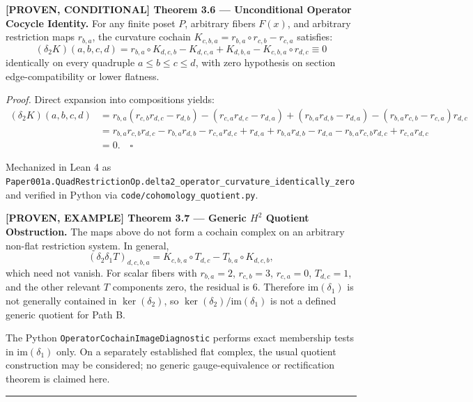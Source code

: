 \documentclass[
  english,
  10pt,
  a4paper,
]{article}
\renewenvironment{quote}
  {\begin{leftbar}\small}
  {\end{leftbar}}
\begin{document}
\begin{quote}
\textbf{{[}PROVEN, CONDITIONAL{]} Theorem 3.6 --- Unconditional Operator
Cocycle Identity.} For any finite poset \(P\), arbitrary fibers
\(F(x)\), and arbitrary restriction maps \(r_{b,a}\), the curvature
cochain \(K_{c,b,a} = r_{b,a} \circ r_{c,b} - r_{c,a}\) satisfies: \[
(\delta_2 K)(a,b,c,d) = r_{b,a} \circ K_{d,c,b} - K_{d,c,a} + K_{d,b,a} - K_{c,b,a} \circ r_{d,c} \equiv 0
\] identically on every quadruple \(a \le b \le c \le d\), with zero
hypothesis on section edge-compatibility or lower flatness.

\emph{Proof.} Direct expansion into compositions yields: \[
\begin{aligned}
(\delta_2 K)(a,b,c,d)
&= r_{b,a}(r_{c,b}r_{d,c} - r_{d,b}) - (r_{c,a}r_{d,c} - r_{d,a}) + (r_{b,a}r_{d,b} - r_{d,a}) - (r_{b,a}r_{c,b} - r_{c,a})r_{d,c} \\
&= r_{b,a}r_{c,b}r_{d,c} - r_{b,a}r_{d,b} - r_{c,a}r_{d,c} + r_{d,a} + r_{b,a}r_{d,b} - r_{d,a} - r_{b,a}r_{c,b}r_{d,c} + r_{c,a}r_{d,c} \\
&= 0. \quad \square
\end{aligned}
\]
\end{quote}

Mechanized in Lean 4 as
\nolinkurl{Paper001a.QuadRestrictionOp.delta2_operator_curvature_identically_zero}
and verified in Python via \nolinkurl{code/cohomology_quotient.py}.

\begin{quote}
\textbf{{[}PROVEN, EXAMPLE{]} Theorem 3.7 --- Generic \(H^2\) Quotient
Obstruction.} The maps above do not form a cochain complex on an
arbitrary non-flat restriction system. In general, \[
(\delta_2\delta_1T)_{d,c,b,a}
=K_{c,b,a}\circ T_{d,c}-T_{b,a}\circ K_{d,c,b},
\] which need not vanish. For scalar fibers with \(r_{b,a}=2\),
\(r_{c,b}=3\), \(r_{c,a}=0\), \(T_{d,c}=1\), and the other relevant
\(T\) components zero, the residual is \(6\). Therefore
\(\mathrm{im}(\delta_1)\) is not generally contained in
\(\ker(\delta_2)\), so \(\ker(\delta_2)/\mathrm{im}(\delta_1)\) is not a
defined generic quotient for Path B.
\end{quote}

The Python \nolinkurl{OperatorCochainImageDiagnostic} performs exact
membership tests in \(\mathrm{im}(\delta_1)\) only. On a separately
established flat complex, the usual quotient construction may be
considered; no generic gauge-equivalence or rectification theorem is
claimed here.

\begin{center}\rule{0.5\linewidth}{0.5pt}\end{center}
\end{document}
